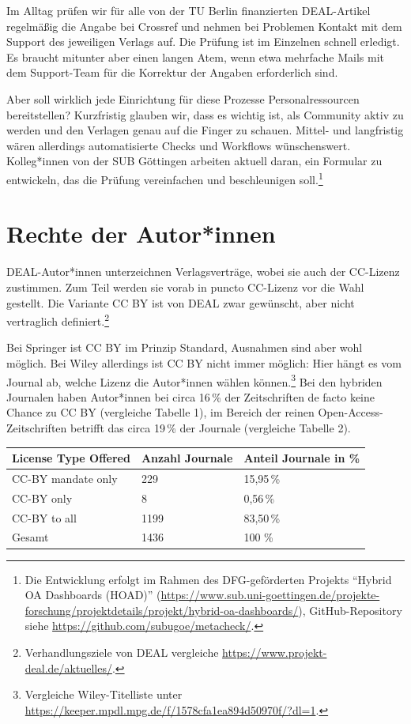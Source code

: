 \documentclass[a4paper,
fontsize=11pt,
oneside,
numbers=noperiodatend,
parskip=half-,
bibliography=totoc,
final
]{scrartcl}
\begin{document}
Im Alltag prüfen wir für alle von der TU Berlin finanzierten
DEAL-Artikel regelmäßig die Angabe bei Crossref und nehmen bei Problemen
Kontakt mit dem Support des jeweiligen Verlags auf. Die Prüfung ist im
Einzelnen schnell erledigt. Es braucht mitunter aber einen langen Atem,
wenn etwa mehrfache Mails mit dem Support-Team für die Korrektur der
Angaben erforderlich sind.

Aber soll wirklich jede Einrichtung für diese Prozesse
Personalressourcen bereitstellen? Kurzfristig glauben wir, dass es
wichtig ist, als Community aktiv zu werden und den Verlagen genau auf
die Finger zu schauen. Mittel- und langfristig wären allerdings
automatisierte Checks und Workflows wünschenswert. Kolleg*innen von der
SUB Göttingen arbeiten aktuell daran, ein Formular zu entwickeln, das
die Prüfung vereinfachen und beschleunigen soll.\footnote{Die
  Entwicklung erfolgt im Rahmen des DFG-geförderten Projekts
  \enquote{Hybrid OA Dashboards (HOAD)}
  (\url{https://www.sub.uni-goettingen.de/projekte-forschung/projektdetails/projekt/hybrid-oa-dashboards/}),
  GitHub-Repository siehe \url{https://github.com/subugoe/metacheck/}.}

\hypertarget{rechte-der-autorinnen}{%
\section{Rechte der Autor*innen}\label{rechte-der-autorinnen}}

DEAL-Autor*innen unterzeichnen Verlagsverträge, wobei sie auch der
CC-Lizenz zustimmen. Zum Teil werden sie vorab in puncto CC-Lizenz vor
die Wahl gestellt. Die Variante CC BY ist von DEAL zwar gewünscht, aber
nicht vertraglich definiert.\footnote{Verhandlungsziele von DEAL
  vergleiche \url{https://www.projekt-deal.de/aktuelles/}.}

Bei Springer ist CC BY im Prinzip Standard, Ausnahmen sind aber wohl
möglich. Bei Wiley allerdings ist CC BY nicht immer möglich: Hier hängt
es vom Journal ab, welche Lizenz die Autor*innen wählen
können.\footnote{Vergleiche Wiley-Titelliste unter
  \url{https://keeper.mpdl.mpg.de/f/1578cfa1ea894d50970f/?dl=1}.} Bei
den hybriden Journalen haben Autor*innen bei circa 16\,\% der
Zeitschriften de facto keine Chance zu CC BY (vergleiche Tabelle 1), im
Bereich der reinen Open-Access-Zeitschriften betrifft das circa 19\,\%
der Journale (vergleiche Tabelle 2).

\begin{longtable}[]{@{}lll@{}}
\toprule
License Type Offered & Anzahl Journale & Anteil Journale in
\%\tabularnewline
\midrule
\endhead
CC-BY mandate only & 229 & 15,95\,\%\tabularnewline
CC-BY only & 8 & 0,56\,\%\tabularnewline
CC-BY to all & 1199 & 83,50\,\%\tabularnewline
Gesamt & 1436 & 100\,\,\%\tabularnewline
\bottomrule
\end{longtable}
\end{document}
